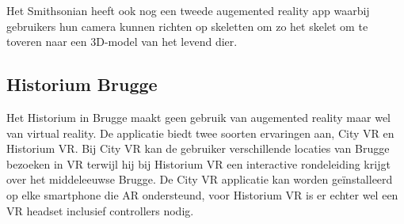 Het Smithsonian heeft ook nog een tweede augemented reality app waarbij gebruikers hun camera kunnen richten op skeletten om zo het skelet om te toveren naar een 3D-model van het levend dier.

\subsection{Historium Brugge}
Het Historium in Brugge maakt geen gebruik van augemented reality maar wel van virtual reality. De applicatie biedt twee soorten ervaringen aan, City VR en Historium VR. Bij City VR kan de gebruiker verschillende locaties van Brugge bezoeken in VR terwijl hij bij Historium VR een interactive rondeleiding krijgt over het middeleeuwse Brugge. De City VR applicatie kan worden geïnstalleerd op elke smartphone die AR ondersteund, voor Historium VR is er echter wel een VR headset inclusief controllers nodig. 